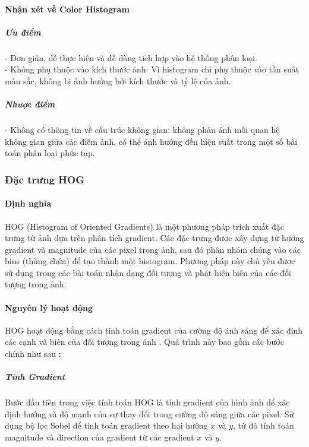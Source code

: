 \documentclass[a4paper,12pt]{article}
\begin{document}
\paragraph{Nhận xét về Color Histogram}

\subparagraph{Ưu điểm}
- Đơn giản, dễ thực hiện và dễ dàng tích hợp vào hệ thống phân loại.\\
- Không phụ thuộc vào kích thước ảnh: Vì histogram chỉ phụ thuộc vào tần suất màu sắc, không bị ảnh hưởng bởi kích thước và tỷ lệ của ảnh.\\

\subparagraph{Nhược điểm}
- Không có thông tin về cấu trúc không gian: không phản ánh mối quan hệ không gian giữa các điểm ảnh, có thể ảnh hưởng đến hiệu suất trong một số bài toán phân loại phức tạp.\\

\subsubsection{Đặc trưng HOG}

\paragraph{Định nghĩa}
\hspace{5mm}HOG (Histogram of Oriented Gradients) là một phương pháp trích xuất đặc trưng từ ảnh dựa trên phân tích gradient. Các đặc trưng được xây dựng từ hướng gradient và magnitude của các pixel trong ảnh, sau đó phân nhóm chúng vào các bins (thùng chứa) để tạo thành một histogram. Phương pháp này chủ yếu được sử dụng trong các bài toán nhận dạng đối tượng và phát hiện biên của các đối tượng trong ảnh.

\paragraph{Nguyên lý hoạt động}
\hspace{5mm}HOG hoạt động bằng cách tính toán gradient của cường độ ánh sáng để xác định các cạnh và biên của đối tượng trong ảnh . Quá trình này bao gồm các bước chính như sau \cite{hog_opencv}:

\subparagraph{Tính Gradient}
\hspace{5mm}Bước đầu tiên trong việc tính toán HOG là tính gradient của hình ảnh để xác định hướng và độ mạnh của sự thay đổi trong cường độ sáng giữa các pixel. Sử dụng bộ lọc Sobel để tính toán gradient theo hai hướng \(x\) và \(y\), từ đó tính toán magnitude và direction của gradient từ các gradient \(x\) và \(y\).
\end{document}
